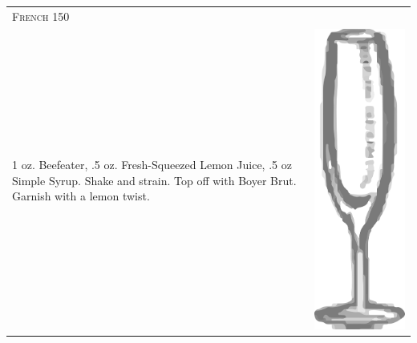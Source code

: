 \documentclass{article}
\begin{document}
\begin{tabular}{p{2in} p{0.5in}}
\multicolumn{2}{p{3in}}{\centering\Huge\textsc{French 150}}\\ 
   \vspace{-0.1in}1 oz. Beefeater, .5 oz. Fresh-Squeezed Lemon Juice, .5 oz Simple Syrup. Shake and strain. Top off with Boyer Brut. Garnish with a lemon twist. &
   \vspace{-0.1in} \includegraphics{flute.png}
\end{tabular}
\end{document}

